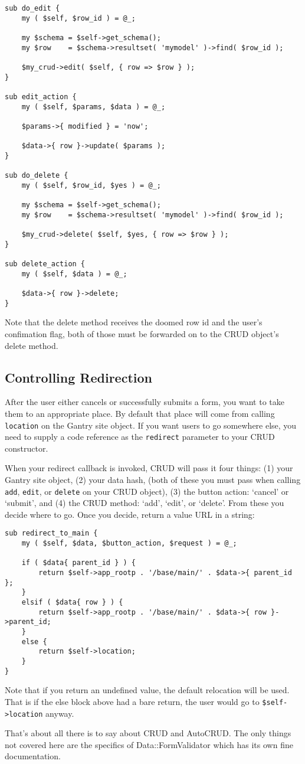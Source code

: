 \begin{verbatim}
sub do_edit {
    my ( $self, $row_id ) = @_;

    my $schema = $self->get_schema();
    my $row    = $schema->resultset( 'mymodel' )->find( $row_id );

    $my_crud->edit( $self, { row => $row } );
}

sub edit_action {
    my ( $self, $params, $data ) = @_;

    $params->{ modified } = 'now';

    $data->{ row }->update( $params );
}

sub do_delete {
    my ( $self, $row_id, $yes ) = @_;

    my $schema = $self->get_schema();
    my $row    = $schema->resultset( 'mymodel' )->find( $row_id );

    $my_crud->delete( $self, $yes, { row => $row } );
}

sub delete_action {
    my ( $self, $data ) = @_;

    $data->{ row }->delete;
}
\end{verbatim}

Note that the delete method receives the doomed row id and the user's
confimation flag, both of those must be forwarded on to the CRUD object's
delete method.

\subsection*{Controlling Redirection}

After the user either cancels or successfully submits a form, you want
to take them to an appropriate place.  By default that place will come from
calling \verb+location+ on the Gantry site object.  If you want users to
go somewhere else, you need to supply a code reference as the \verb+redirect+
parameter to your CRUD constructor.

When your redirect callback is invoked, CRUD will pass it four things:
(1) your Gantry site object, (2) your data hash, (both of these you must
pass when calling \verb+add+, \verb+edit+, or \verb+delete+ on your CRUD
object), (3) the button action: `cancel' or `submit', and (4) the CRUD
method: `add', `edit', or `delete'.  From these you decide where to go.
Once you decide, return a value URL in a string:

\begin{verbatim}
sub redirect_to_main {
    my ( $self, $data, $button_action, $request ) = @_;

    if ( $data{ parent_id } ) {
        return $self->app_rootp . '/base/main/' . $data->{ parent_id };
    }
    elsif ( $data{ row } ) {
        return $self->app_rootp . '/base/main/' . $data->{ row }->parent_id;
    }
    else {
        return $self->location;
    }
}
\end{verbatim}

Note that if you return an undefined value, the default relocation will
be used.  That is if the else block above had a bare return, the user would
go to \verb+$self->location+ anyway.

That's about all there is to say about CRUD and AutoCRUD.  The only things
not covered here are the specifics of Data::FormValidator which has its
own fine documentation.
